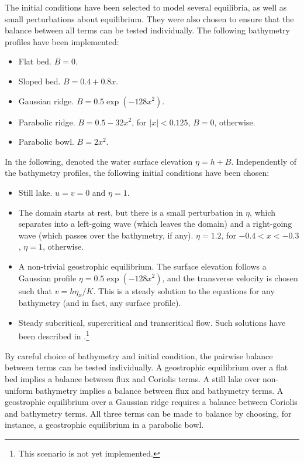 \documentclass[a4paper,onecolumn,11pt]{article}
\begin{document}
The initial conditions have been selected to model several equilibria, as well as small perturbations about equilibrium. They were also chosen to ensure that the balance between all terms can be tested individually. The following bathymetry profiles have been implemented:

\begin{itemize}
  \item Flat bed. $B = 0$.
  \item Sloped bed. $B = 0.4 + 0.8x$.
  \item Gaussian ridge. $B = 0.5 \exp(-128x^2)$.
  \item Parabolic ridge. $B = 0.5 - 32x^2$, for $|x| < 0.125$, $B = 0$, otherwise.
  \item Parabolic bowl. $B = 2x^2$.
\end{itemize}

In the following, denoted the water surface elevation $\eta = h + B$. Independently of the bathymetry profiles, the following initial conditions have been chosen:

\begin{itemize}
  \item Still lake. $u = v = 0$ and $\eta = 1$.
  \item The domain starts at rest, but there is a small perturbation in $\eta$, which separates into a left-going wave (which leaves the domain) and a right-going wave (which passes over the bathymetry, if any). $\eta = 1.2$, for $-0.4 < x < -0.3$, $\eta = 1$, otherwise.
  \item A non-trivial geostrophic equilibrium. The surface elevation follows a Gaussian profile $\eta = 0.5 \exp(-128x^2)$, and the transverse velocity is chosen such that $v = h\eta_x / K$. This is a steady solution to the equations for any bathymetry (and in fact, any surface profile).
  \item Steady subcritical, supercritical and transcritical flow. Such solutions have been described in \citet{esler2005steady}.\footnote{This scenario is not yet implemented.}
\end{itemize}

By careful choice of bathymetry and initial condition, the pairwise balance between terms can be tested individually. A geostrophic equilibrium over a flat bed implies a balance between flux and Coriolis terms. A still lake over non-uniform bathymetry implies a balance between flux and bathymetry terms. A geostrophic equilibrium over a Gaussian ridge requires a balance between Coriolis and bathymetry terms. All three terms can be made to balance by choosing, for instance, a geostrophic equilibrium in a parabolic bowl.
\end{document}
